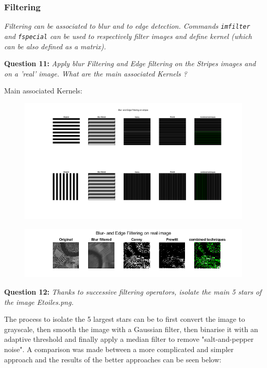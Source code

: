 \subsubsection{Filtering}
\textit{Filtering can be associated to blur and to edge detection. Commands \texttt{imfilter} and \texttt{fspecial} can be used to respectively ﬁlter images and deﬁne kernel (which can be also deﬁned as a matrix).}


\textbf{Question 11:}
\textit{Apply blur Filtering and Edge ﬁltering on the Stripes images and on a ’real’ image. What are the main associated Kernels ?}

Main associated Kernels:
\TODO{}

\begin{figure}[H]
    \centering
    \includegraphics[width=\linewidth]{Doc/Graphics/Part1/Q11a.png}
\end{figure}

\begin{figure}[H]
    \centering
    \includegraphics[width=\linewidth]{Doc/Graphics/Part1/Q11b.png}
\end{figure}

\textbf{Question 12:}
\textit{Thanks to successive ﬁltering operators, isolate the main 5 stars of the image Etoiles.png.}

The process to isolate the 5 largest stars can be to first convert the image to grayscale, then smooth the image with a Gaussian filter, then binarise it with an adaptive threshold and finally apply a median filter to remove "salt-and-pepper noise". A comparison was made between a more complicated and simpler approach and the results of the better approaches can be seen below:


